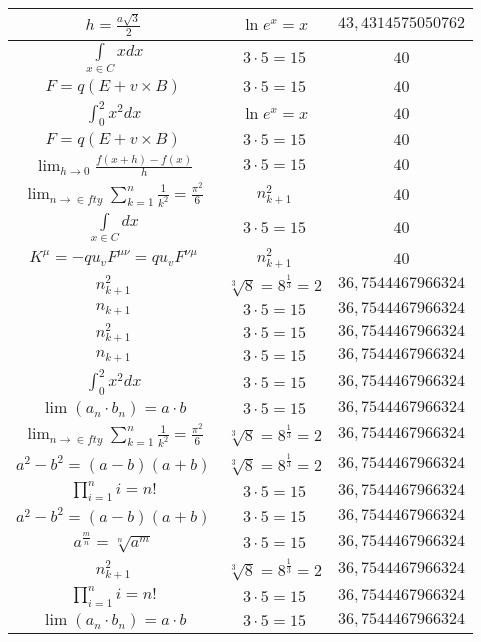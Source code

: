 \documentclass{article}
\begin{document}
\begin{flushleft}
\begin{longtable}{|c|c|c|}
$h=\frac{a\sqrt{3}}{2}$ & $\ln e^x=x$ & $43,4314575050762$ \\ \hline 
$\int \limits_{x\in C}xdx$ & $3\cdot 5=15$ & $40$ \\ \hline 
$F=q\left(E+v\times B\right)$ & $3\cdot 5=15$ & $40$ \\ \hline 
$\int _0^2x^2dx$ & $\ln e^x=x$ & $40$ \\ \hline 
$F=q\left(E+v\times B\right)$ & $3\cdot 5=15$ & $40$ \\ \hline 
$\lim_{h\to0}\frac{f(x+h)-f(x)}{h}$ & $3\cdot 5=15$ & $40$ \\ \hline 
$\lim_{n\to\in fty}\sum_{k=1}^n\frac{1}{k^2}=\frac{\pi^2}{6}$ & $n_{k+1}^2$ & $40$ \\ \hline 
$\int \limits_{x\in C}dx$ & $3\cdot 5=15$ & $40$ \\ \hline 
$K^\mu=-qu_vF^{\mu\nu}=qu_vF^{\nu\mu}$ & $n_{k+1}^2$ & $40$ \\ \hline 
$n_{k+1}^2$ & $\sqrt[3]{8}=8^{\frac{1}{3}}=2$ & $36,7544467966324$ \\ \hline 
$n_{k+1}$ & $3\cdot 5=15$ & $36,7544467966324$ \\ \hline 
$n_{k+1}^2$ & $3\cdot 5=15$ & $36,7544467966324$ \\ \hline 
$n_{k+1}$ & $3\cdot 5=15$ & $36,7544467966324$ \\ \hline 
$\int _0^2x^2dx$ & $3\cdot 5=15$ & $36,7544467966324$ \\ \hline 
$\lim\left(a_n\cdot b_n\right)=a\cdot b$ & $3\cdot 5=15$ & $36,7544467966324$ \\ \hline 
$\lim_{n\to\in fty}\sum_{k=1}^n\frac{1}{k^2}=\frac{\pi^2}{6}$ & $\sqrt[3]{8}=8^{\frac{1}{3}}=2$ & $36,7544467966324$ \\ \hline 
$a^2-b^2=(a-b)(a+b)$ & $\sqrt[3]{8}=8^{\frac{1}{3}}=2$ & $36,7544467966324$ \\ \hline 
$\prod_{i=1}^ni=n!$ & $3\cdot 5=15$ & $36,7544467966324$ \\ \hline 
$a^2-b^2=(a-b)(a+b)$ & $3\cdot 5=15$ & $36,7544467966324$ \\ \hline 
$a^{\frac{m}{n}}=\sqrt[n]{a^{m}}$ & $3\cdot 5=15$ & $36,7544467966324$ \\ \hline 
$n_{k+1}^2$ & $\sqrt[3]{8}=8^{\frac{1}{3}}=2$ & $36,7544467966324$ \\ \hline 
$\prod_{i=1}^ni=n!$ & $3\cdot 5=15$ & $36,7544467966324$ \\ \hline 
$\lim\left(a_n\cdot b_n\right)=a\cdot b$ & $3\cdot 5=15$ & $36,7544467966324$ \\ \hline 

\end{longtable}
\end{flushleft}
\end{document}
